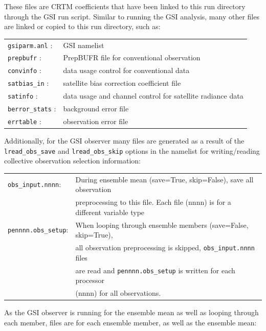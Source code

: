 These files are CRTM coefficients that have been linked to this run directory through the GSI run script. Similar to running the GSI analysis, many other files are linked or copied to this run directory, such as:

\begin{table}[htbp]
\centering
\begin{tabular}{ll}
\verb|gsiparm.anl| :   & GSI namelist   \\
\verb|prepbufr| :   &  PrepBUFR file for conventional observation \\
\verb|convinfo| :   &  data usage control for conventional data \\
\verb|satbias_in| :   &  satellite bias correction coefficient file  \\
\verb|satinfo| :   &   data usage and channel control for satellite radiance data \\
\verb|berror_stats| :   &  background error file \\
\verb|errtable| :    &    observation error file \\
\end{tabular}
\end{table}
Additionally, for the GSI observer many files are generated as a result of the \verb|lread_obs_save| and \verb|lread_obs_skip| options in the namelist for writing/reading collective observation selection information:
\begin{table}[htbp]
\centering
\begin{tabular}{ll}
\verb|obs_input.nnnn|:  & During ensemble mean (save=True, skip=False), save all observation  \\
                                      & preprocessing to this file. Each file (nnnn) is for a different variable type \\
\verb|pennnn.obs_setup|:  &  When looping through ensemble members (save=False, skip=True), \\
                                          & all observation preprocessing is skipped, \verb|obs_input.nnnn| files \\
                                          & are read and \verb|pennnn.obs_setup| is written for each processor \\
                                          & (nnnn) for all observations.\\ 
\end{tabular}
\end{table}

As the GSI observer is running for the ensemble mean as well as looping through each member, files are for each ensemble member, as well as the ensemble mean: \\

